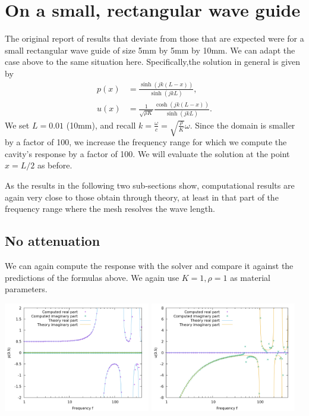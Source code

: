 \documentclass{article}
\begin{document}
\section{On a small, rectangular wave guide}

The original report of results that deviate from those that are
expected were for a small rectangular wave guide of size 5mm by 5mm by
10mm. We can adapt the case above to the same situation
here. Specifically,the solution in general is given by
\begin{align*}
  p(x)
  &=
  \frac{\sinh(jk(L-x))}{\sinh(jkL)},
  \\
  u(x)
  &=
  \frac{1}{\sqrt{\rho K}}
  \frac{\cosh(jk(L-x))}{\sinh(jkL)}.
\end{align*}
We set $L=0.01$ (10mm), and recall
$k=\frac{\omega}{c}=\sqrt{\frac{\rho}{K}}\omega$. Since the domain is
smaller by a factor of 100, we increase the frequency range for which
we compute the cavity's response by a factor of 100. We will evaluate
the solution at the point $x=L/2$ as before.

As the results in the following two sub-sections show, computational
results are again very close to those obtain through theory, at least
in that part of the frequency range where the mesh resolves the wave length.

\subsection{No attenuation}

We can again compute the response with the solver and compare it
against the predictions of the formulas above. We again use
$K=1,\rho=1$ as material parameters.

\begin{center}
\includegraphics[width=0.48\textwidth]{wave-guide/no-attenuation/pressure-at-center.png}
\includegraphics[width=0.48\textwidth]{wave-guide/no-attenuation/velocity-at-center.png}
\end{center}
\end{document}
